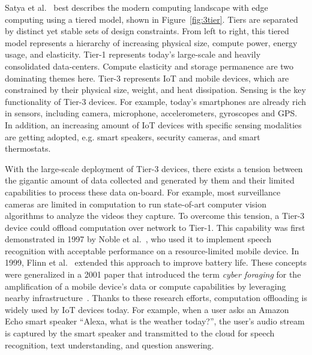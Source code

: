 Satya et al.~\cite{satya2019computing} best describes the modern computing
landscape with edge computing using a tiered model, shown in
Figure~\ref{fig:3tier}. Tiers are separated by distinct yet stable sets of
design constraints. From left to right, this tiered model represents a hierarchy
of increasing physical size, compute power, energy usage, and elasticity. Tier-1
represents today's large-scale and heavily consolidated data-centers. Compute
elasticity and storage permanence are two dominating themes here. Tier-3
represents IoT and mobile devices, which are constrained by their physical size,
weight, and heat dissipation. Sensing is the key functionality of Tier-3
devices. For example, today's smartphones are already rich in sensors, including
camera, microphone, accelerometers, gyroscopes and GPS. In addition, an
increasing amount of IoT devices with specific sensing modalities are getting
adopted, e.g. smart speakers, security cameras, and smart thermostats.

With the large-scale deployment of Tier-3 devices, there exists a tension
between the gigantic amount of data collected and generated by them and their
limited capabilities to process these data on-board. For example, most
surveillance cameras are limited in computation to run state-of-art computer
vision algorithms to analyze the videos they capture. To overcome this tension,
a Tier-3 device could offload computation over network to Tier-1. This
capability was first demonstrated in 1997 by Noble et al.~\cite{Noble1997}, who
used it to implement speech recognition with acceptable performance on a
resource-limited mobile device. In 1999, Flinn et al.~\cite{Flinn1999} extended
this approach to improve battery life.  These concepts were generalized in a
2001 paper that introduced the term {\em cyber foraging} for the amplification
of a mobile device's data or compute capabilities by leveraging nearby
infrastructure~\cite{Satya2001}.  Thanks to these research efforts, computation
offloading is widely used by IoT devices today. For example, when a user asks an
Amazon Echo smart speaker ``Alexa, what is the weather today?'', the user's
audio stream is captured by the smart speaker and transmitted to the cloud for
speech recognition, text understanding, and question answering.

